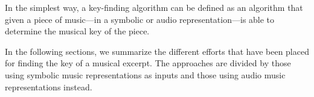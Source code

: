 


In the simplest way, a key-finding algorithm can be defined
as an algorithm that given a piece of music---in a symbolic
or audio representation---is able to determine the musical
key of the piece.

In the following sections, we summarize the different
efforts that have been placed for finding the key of a
musical excerpt. The approaches are divided by those using
symbolic music representations as inputs and those using
audio music representations instead.






